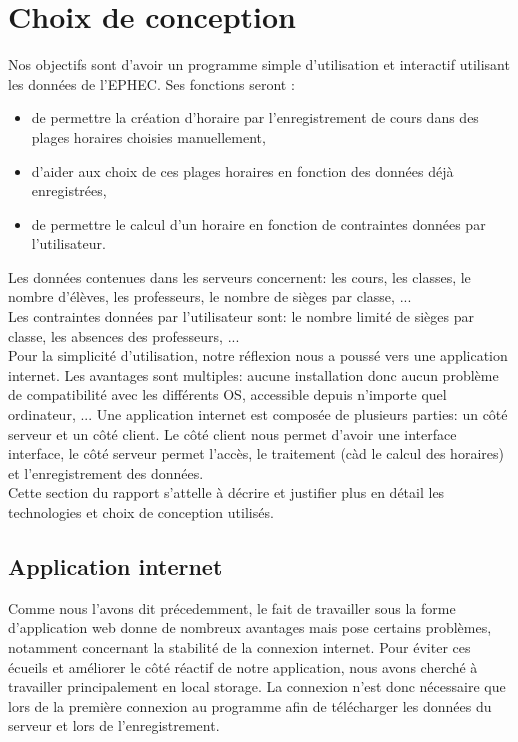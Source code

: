 \section{Choix de conception}
Nos objectifs sont d'avoir un programme simple d'utilisation et interactif utilisant les données de l'EPHEC.
Ses fonctions seront :\\
\begin{itemize}
      \item de permettre la création d'horaire par l'enregistrement de cours dans des plages horaires choisies manuellement,
      \item d'aider aux choix de ces plages horaires en fonction des données déjà enregistrées,
      \item de permettre le calcul d'un horaire en fonction de contraintes données par l'utilisateur.\\
\end{itemize}

Les données contenues dans les serveurs concernent: les cours, les classes, le nombre d'élèves, les professeurs,
 le nombre de sièges par classe, ...\\
Les contraintes données par l'utilisateur sont: le nombre limité de sièges par classe, les absences des professeurs, ... \\

Pour la simplicité d'utilisation, notre réflexion nous a poussé vers une application internet.
Les avantages sont multiples: aucune installation donc aucun problème de compatibilité avec les différents OS,
 accessible depuis n'importe quel ordinateur, ... 
Une application internet est composée de plusieurs parties: un côté serveur et un côté client.
Le côté client nous permet d'avoir une interface interface, le côté serveur permet l'accès,
 le traitement (càd le calcul des horaires) et l'enregistrement des données.\\


Cette section du rapport s'attelle à décrire et justifier plus en détail les technologies et choix de conception utilisés. 


  \subsection{Application internet}
  Comme nous l'avons dit précedemment, le fait de travailler sous la forme d'application web donne de nombreux avantages 
  mais pose certains problèmes, notamment concernant la stabilité de la connexion internet.
  Pour éviter ces écueils et améliorer le côté réactif de notre application, nous avons cherché à travailler principalement en local storage.
  La connexion n'est donc nécessaire que lors de la première connexion au programme afin de télécharger les données du serveur et lors de l'enregistrement.\\

